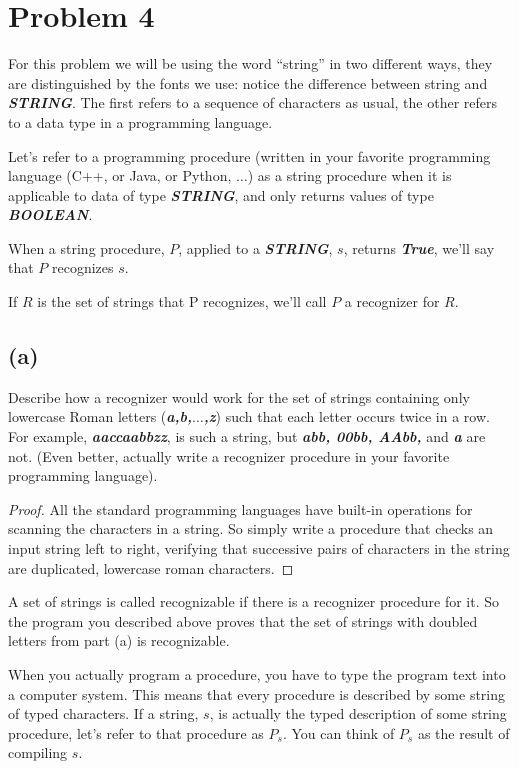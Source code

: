 \documentclass[14pt]{extarticle}
\newcommand{\str}[1]{\textit{\textbf{#1}}}
\begin{document}
\section{Problem 4}
For this problem we will be using the word ``string'' in two different ways, they are distinguished by the fonts we use: notice the difference between string and \str{STRING}. The first refers to a sequence of characters as usual, the other refers to a data type in a programming language.

Let's refer to a programming procedure (written in your favorite programming language (C++, or Java, or Python, $\ldots$) as a string procedure when it is applicable to data of type \str{STRING}, and only returns values of type \str{BOOLEAN}. 

When a string procedure, $P$, applied to a \str{STRING}, $s$, returns \str{True}, we'll say that $P$ recognizes $s$. 

If $R$ is the set of strings that P recognizes, we'll call $P$ a recognizer for $R$.
\subsection{(a)}
Describe how a recognizer would work for the set of strings containing only lowercase Roman letters (\str{a,b,$\ldots$,z}) such that each letter occurs twice in a row. For example, \str{aaccaabbzz}, is such a string, but \str{abb, 00bb, AAbb,} and \str{a} are not. (Even better, actually write a recognizer procedure in your favorite programming language).

\begin{proof}
All the standard programming languages have built-in operations for scanning the characters in a string. So simply write a procedure that checks an input string left to right, verify­ing that successive pairs of characters in the string are duplicated, lowercase roman characters.
\end{proof}

A set of strings is called recognizable if there is a recognizer procedure for it. So the program you described above proves that the set of strings with doubled letters from part (a) is recognizable.

When you actually program a procedure, you have to type the program text into a computer system. This means that every procedure is described by some string of typed characters. If a string, $s$, is actually the typed description of some string procedure, let’s refer to that procedure as $P_s$. You can think of $P_s$ as the result of compiling $s$.
\end{document}
